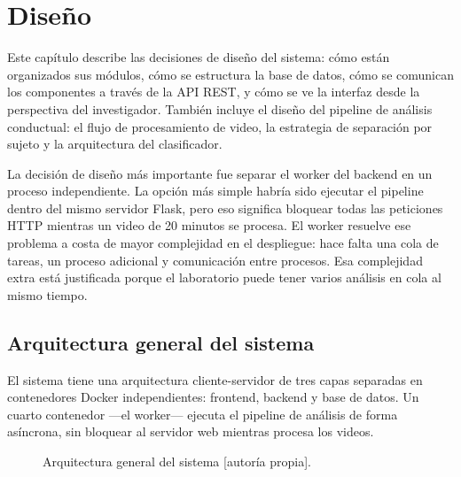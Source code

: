 
\chapter{Diseño}

Este capítulo describe las decisiones de diseño del sistema: cómo están organizados
sus módulos, cómo se estructura la base de datos, cómo se comunican los componentes
a través de la API REST, y cómo se ve la interfaz desde la perspectiva del investigador.
También incluye el diseño del pipeline de análisis conductual: el flujo de procesamiento
de video, la estrategia de separación por sujeto y la arquitectura del clasificador.

La decisión de diseño más importante fue separar el worker del backend en un proceso
independiente. La opción más simple habría sido ejecutar el pipeline dentro del mismo
servidor Flask, pero eso significa bloquear todas las peticiones HTTP mientras un video
de 20 minutos se procesa. El worker resuelve ese problema a costa de mayor complejidad
en el despliegue: hace falta una cola de tareas, un proceso adicional y comunicación
entre procesos. Esa complejidad extra está justificada porque el laboratorio puede
tener varios análisis en cola al mismo tiempo.

\section{Arquitectura general del sistema}

El sistema tiene una arquitectura cliente-servidor de tres capas separadas en
contenedores Docker independientes: frontend, backend y base de datos. Un cuarto
contenedor ---el worker--- ejecuta el pipeline de análisis de forma asíncrona, sin
bloquear al servidor web mientras procesa los videos.

\begin{figure}[ht]
\centering
\caption{Arquitectura general del sistema [autoría propia].}
\label{fig:arquitectura}
\end{figure}

